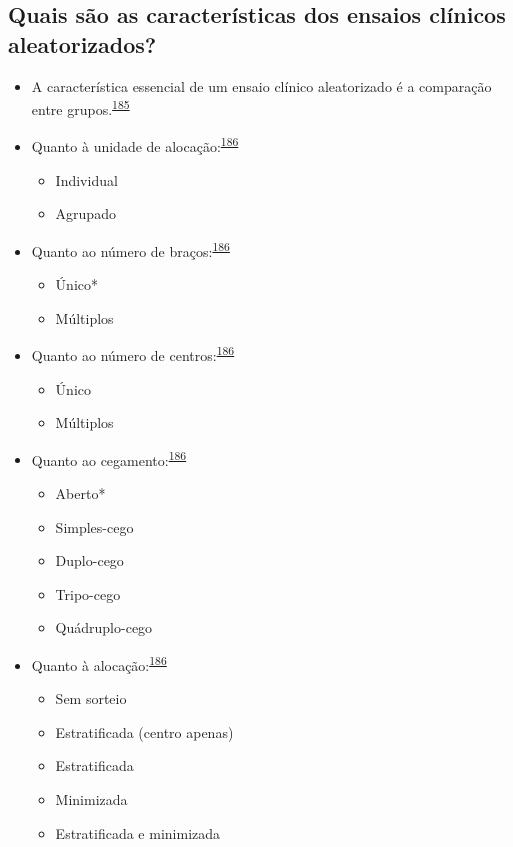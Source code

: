 \documentclass[
  a4paper,
]{book}
\begin{document}
\hypertarget{quais-suxe3o-as-caracteruxedsticas-dos-ensaios-cluxednicos-aleatorizados}{%
\subsection{Quais são as características dos ensaios clínicos aleatorizados?}\label{quais-suxe3o-as-caracteruxedsticas-dos-ensaios-cluxednicos-aleatorizados}}

\begin{itemize}
\item
  A característica essencial de um ensaio clínico aleatorizado é a comparação entre grupos.\textsuperscript{\protect\hyperlink{ref-bland2011}{185}}
\item
  Quanto à unidade de alocação:\textsuperscript{\protect\hyperlink{ref-Bruce2022}{186}}

  \begin{itemize}
  \item
    Individual
  \item
    Agrupado
  \end{itemize}
\item
  Quanto ao número de braços:\textsuperscript{\protect\hyperlink{ref-Bruce2022}{186}}

  \begin{itemize}
  \item
    Único*
  \item
    Múltiplos
  \end{itemize}
\item
  Quanto ao número de centros:\textsuperscript{\protect\hyperlink{ref-Bruce2022}{186}}

  \begin{itemize}
  \item
    Único
  \item
    Múltiplos
  \end{itemize}
\item
  Quanto ao cegamento:\textsuperscript{\protect\hyperlink{ref-Bruce2022}{186}}

  \begin{itemize}
  \item
    Aberto*
  \item
    Simples-cego
  \item
    Duplo-cego
  \item
    Tripo-cego
  \item
    Quádruplo-cego
  \end{itemize}
\item
  Quanto à alocação:\textsuperscript{\protect\hyperlink{ref-Bruce2022}{186}}

  \begin{itemize}
  \item
    Sem sorteio
  \item
    Estratificada (centro apenas)
  \item
    Estratificada
  \item
    Minimizada
  \item
    Estratificada e minimizada
  \end{itemize}
\end{itemize}
\end{document}
